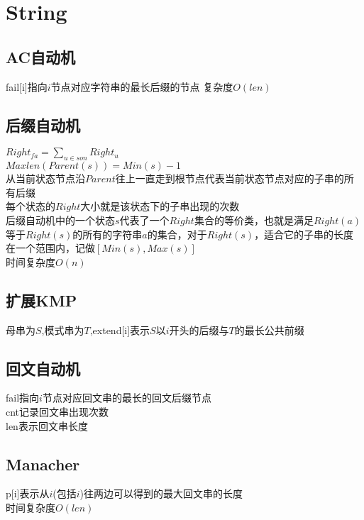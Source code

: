 \section{String}

\subsection{AC自动机}
fail[i]指向$i$节点对应字符串的最长后缀的节点
复杂度$O(len)$


\subsection{后缀自动机}
$Right_{fa}=\sum_{u \in son} Right_u$\\
$Maxlen(Parent(s))=Min(s) - 1$\\
从当前状态节点沿$Parent$往上一直走到根节点代表当前状态节点对应的子串的所有后缀\\
每个状态的$Right$大小就是该状态下的子串出现的次数\\
后缀自动机中的一个状态$s$代表了一个$Right$集合的等价类，也就是满足$Right(a)$等于$Right(s)$的所有的字符串$a$的集合，对于$Right(s)$，适合它的子串的长度在一个范围内，记做$[Min(s),Max(s)]$\\
时间复杂度$O(n)$\\


\subsection{扩展KMP}
母串为$S$,模式串为$T$,extend[i]表示$S$以$i$开头的后缀与$T$的最长公共前缀\\


\subsection{回文自动机}
fail指向$i$节点对应回文串的最长的回文后缀节点\\
cnt记录回文串出现次数\\
len表示回文串长度


\subsection{Manacher}
p[i]表示从$i$(包括$i$)往两边可以得到的最大回文串的长度\\
时间复杂度$O(len)$
